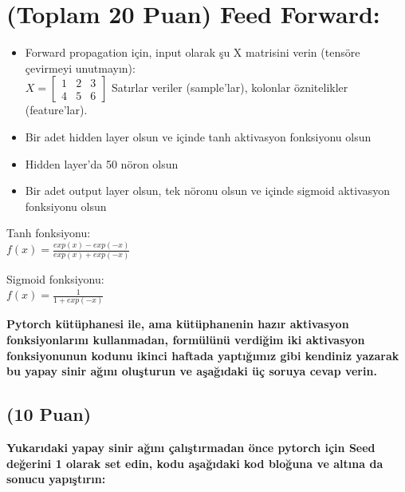 \documentclass[11pt]{article}
\begin{document}
\section{(Toplam 20 Puan) Feed Forward:}
 
\begin{itemize}
    \item Forward propagation için, input olarak şu X matrisini verin (tensöre çevirmeyi unutmayın):\\
    $X = \begin{bmatrix}
        1 & 2 & 3\\
        4 & 5 & 6
        \end{bmatrix}$
    Satırlar veriler (sample'lar), kolonlar öznitelikler (feature'lar).
    \item Bir adet hidden layer olsun ve içinde tanh aktivasyon fonksiyonu olsun
    \item Hidden layer'da 50 nöron olsun
    \item Bir adet output layer olsun, tek nöronu olsun ve içinde sigmoid aktivasyon fonksiyonu olsun
\end{itemize}

Tanh fonksiyonu:\\
$f(x) = \frac{exp(x) - exp(-x)}{exp(x) + exp(-x)}$
\vspace{.2in}

Sigmoid fonksiyonu:\\
$f(x) = \frac{1}{1 + exp(-x)}$

\vspace{.2in}
 \textbf{Pytorch kütüphanesi ile, ama kütüphanenin hazır aktivasyon fonksiyonlarını kullanmadan, formülünü verdiğim iki aktivasyon fonksiyonunun kodunu ikinci haftada yaptığımız gibi kendiniz yazarak bu yapay sinir ağını oluşturun ve aşağıdaki üç soruya cevap verin.}


\clearpage %


\subsection{(10 Puan)} \textbf{Yukarıdaki yapay sinir ağını çalıştırmadan önce pytorch için Seed değerini 1 olarak set edin, kodu aşağıdaki kod bloğuna ve altına da sonucu yapıştırın:}

\end{document}
